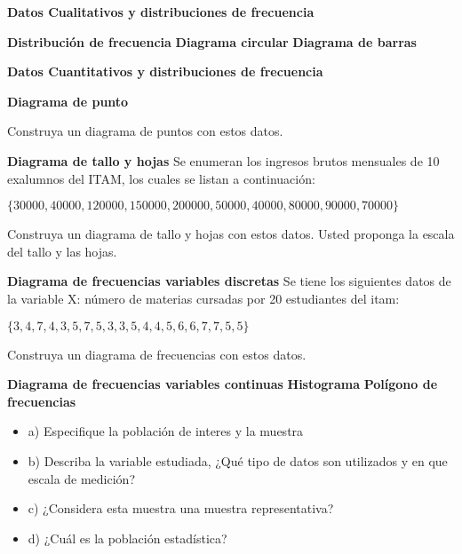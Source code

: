 \documentclass{oxmathproblems}
\begin{document}
\begin{questions}

\miquestion \textbf{Datos Cualitativos y distribuciones de frecuencia}

\textbf{Distribución de frecuencia}
\textbf{Diagrama circular}
\textbf{Diagrama de barras}

\miquestion \textbf{Datos Cuantitativos y distribuciones de frecuencia}

\textbf{Diagrama de punto}

Construya un diagrama de puntos con estos datos.

\textbf{Diagrama de tallo y hojas}
Se enumeran los ingresos brutos mensuales de 10 exalumnos del ITAM, los cuales se listan a continuación:

$\{30000, 40000, 120000, 150000, 200000, 50000, 40000, 80000, 90000, 70000\}$

Construya un diagrama de tallo y hojas con estos datos. Usted proponga la escala del tallo y las hojas.


\textbf{Diagrama de frecuencias variables discretas}
Se tiene los siguientes datos de la variable X: número de materias cursadas por 20 estudiantes del itam:

$\{3,4,7,4,3,5,7,5,3,3,5,4,4,5,6,6,7,7,5,5\}$

Construya un diagrama de frecuencias con estos datos.

\textbf{Diagrama de frecuencias variables continuas}
\textbf{Histograma}
\textbf{Polígono de frecuencias}



\begin{itemize}
\item a) Especifique la población de interes y la muestra
\item b) Describa la variable estudiada, ¿Qué tipo de datos son utilizados y en que escala de medición?
\item c) ¿Considera esta muestra una muestra representativa?
\item d) ¿Cuál es la población estadística?
\end{itemize}

\end{questions}
\end{document}
